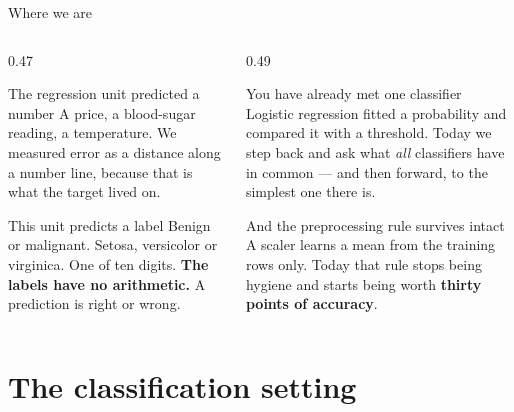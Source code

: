 \documentclass[aspectratio=169]{beamer}
\begin{document}
\begin{frame}[shrink=5]{Where we are}
  \begin{columns}[T]
    \begin{column}{0.47\textwidth}
      \begin{block}{The regression unit predicted a number}
        A price, a blood-sugar reading, a temperature. We measured error as a
        distance along a number line, because that is what the target lived
        on.
      \end{block}
      \begin{block}{This unit predicts a label}
        Benign or malignant. Setosa, versicolor or virginica. One of ten
        digits. \textbf{The labels have no arithmetic.} A prediction is right
        or wrong.
      \end{block}
    \end{column}
    \begin{column}{0.49\textwidth}
      \begin{exampleblock}{You have already met one classifier}
        Logistic regression fitted a probability and compared it with a
        threshold. Today we step back and ask what \emph{all} classifiers have
        in common --- and then forward, to the simplest one there is.
      \end{exampleblock}
      \begin{alertblock}{And the preprocessing rule survives intact}
        A scaler learns a mean from the training rows only. Today that rule
        stops being hygiene and starts being worth \textbf{thirty points of
        accuracy}.
      \end{alertblock}
    \end{column}
  \end{columns}
\end{frame}

\section[Setting]{The classification setting}
\label{sec:setting}
\end{document}
